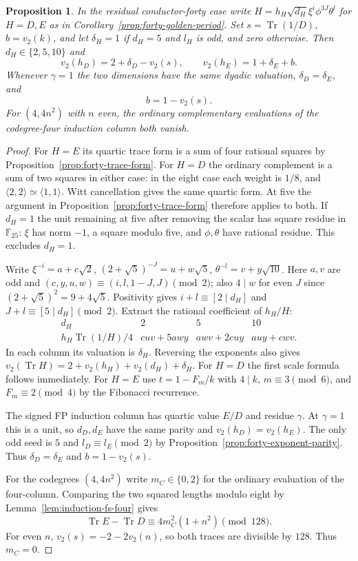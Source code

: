 \documentclass[11pt,reqno]{amsart}
\newtheorem{proposition}[theorem]{Proposition}
\theoremstyle{remark}\newtheorem{remark}[theorem]{Remark}
\numberwithin{equation}{section}
\begin{document}
\begin{proposition}\label{prop:forty-marked-scales}
In the residual conductor-forty case write
$H=h_H\sqrt{d_H}\xi^i\phi^{3J}\theta^l$ for $H=D,E$ as in
Corollary~\ref{prop:forty-golden-period}.
Set $s=\operatorname{Tr}(1/D)$, $b=v_2(k)$, and let
$\delta_H=1$ if $d_H=5$ and $l_H$ is odd, and zero otherwise.
Then $d_H\in\{2,5,10\}$ and
\[
 v_2(h_D)=2+\delta_D-v_2(s),\qquad v_2(h_E)=1+\delta_E+b .
\]
Whenever $\gamma=1$ the two dimensions have the same dyadic
valuation, $\delta_D=\delta_E$, and
\[
                         b=1-v_2(s).
\]
For $(4,4n^2)$ with $n$ even, the ordinary complementary
evaluations of the codegree-four induction column both vanish.
\end{proposition}
\begin{proof}
For $H=E$ its quartic trace form is a sum of four rational squares by
Proposition~\ref{prop:forty-trace-form}. For $H=D$ the ordinary
complement is a sum of two squares in either case: in the eight case
each weight is $1/8$, and $\langle2,2\rangle\simeq\langle1,1\rangle$.
Witt cancellation gives the same quartic form. At five the argument
in Proposition~\ref{prop:forty-trace-form} therefore applies to both.
If $d_H=1$ the unit remaining at five after removing the scalar
has square residue in $\mathbb F_{25}$: $\xi$ has norm $-1$,
a square modulo five, and $\phi,\theta$ have rational residue.
This excludes $d_H=1$.

Write $\xi^{-i}=a+c\sqrt2$, $(2+\sqrt5)^{-J}=u+w\sqrt5$,
$\theta^{-l}=v+y\sqrt{10}$. Here $a,v$ are odd and
$(c,y,u,w)\equiv(i,l,1-J,J)\pmod2$; also $4\mid w$ for even $J$
since $(2+\sqrt5)^2=9+4\sqrt5$. Positivity gives
$i+l\equiv[2\mid d_H]$ and $J+l\equiv[5\mid d_H]\pmod2$.
Extract the rational coefficient of $h_H/H$:
\[
\begin{array}{c|ccc}
 d_H&2&5&10\\\hline
 h_H\operatorname{Tr}(1/H)/4&cuv+5awy&awv+2cuy&auy+cwv .
\end{array}
\]
In each column its valuation is $\delta_H$. Reversing the exponents
also gives $v_2(\operatorname{Tr}H)=2+v_2(h_H)+v_2(d_H)+\delta_H$.
For $H=D$ the first scale formula follows immediately. For $H=E$
use $t=1-F_m/k$ with $4\mid k$, $m\equiv3\pmod6$, and
$F_m\equiv2\pmod4$ by the Fibonacci recurrence.

The signed FP induction column has quartic value $E/D$ and residue
$\gamma$. At $\gamma=1$ this is a unit, so $d_D,d_E$ have the same
parity and $v_2(h_D)=v_2(h_E)$. The only odd seed is $5$ and
$l_D\equiv l_E\pmod2$ by Proposition~\ref{prop:forty-exponent-parity}.
Thus $\delta_D=\delta_E$ and $b=1-v_2(s)$.

For the codegrees $(4,4n^2)$ write $m_C\in\{0,2\}$ for the
ordinary evaluation of the four-column. Comparing the two squared
lengths modulo eight by Lemma~\ref{lem:induction-fs-four} gives
\begin{equation}\label{eq:forty-four-norm-congruence}
 \operatorname{Tr}E-\operatorname{Tr}D
                 \equiv 4m_C^2(1+n^2)\pmod{128}.
\end{equation}
For even $n$, $v_2(s)=-2-2v_2(n)$, so both traces are divisible
by $128$. Thus $m_C=0$.
\end{proof}
\end{document}
